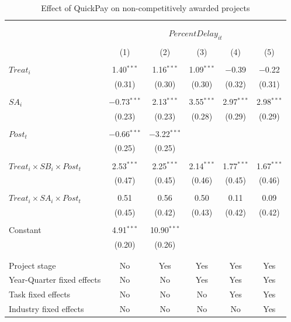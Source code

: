 \documentclass[
]{article}
\begin{document}
\begin{table}[H] \centering 
  \caption{Effect of QuickPay on non-competitively awarded projects} 
  \label{} 
\small 
\begin{tabular}{@{\extracolsep{-2pt}}lccccc} 
\\[-1.8ex]\hline 
\hline \\[-1.8ex] 
\\[-1.8ex] & \multicolumn{5}{c}{$PercentDelay_{it}$  } \\ 
\\[-1.8ex] & (1) & (2) & (3) & (4) & (5)\\ 
\hline \\[-1.8ex] 
 $Treat_i$ & 1.40$^{***}$ & 1.16$^{***}$ & 1.09$^{***}$ & $-$0.39 & $-$0.22 \\ 
  & (0.31) & (0.30) & (0.30) & (0.32) & (0.31) \\ 
  & & & & & \\ 
 $SA_i$ & $-$0.73$^{***}$ & 2.13$^{***}$ & 3.55$^{***}$ & 2.97$^{***}$ & 2.98$^{***}$ \\ 
  & (0.23) & (0.23) & (0.28) & (0.29) & (0.29) \\ 
  & & & & & \\ 
 $Post_t$ & $-$0.66$^{***}$ & $-$3.22$^{***}$ &  &  &  \\ 
  & (0.25) & (0.25) &  &  &  \\ 
  & & & & & \\ 
 $Treat_i \times SB_i \times Post_t$ & 2.53$^{***}$ & 2.25$^{***}$ & 2.14$^{***}$ & 1.77$^{***}$ & 1.67$^{***}$ \\ 
  & (0.47) & (0.45) & (0.46) & (0.45) & (0.46) \\ 
  & & & & & \\ 
 $Treat_i \times SA_i \times Post_t$ & 0.51 & 0.56 & 0.50 & 0.11 & 0.09 \\ 
  & (0.45) & (0.42) & (0.43) & (0.42) & (0.42) \\ 
  & & & & & \\ 
 Constant & 4.91$^{***}$ & 10.90$^{***}$ &  &  &  \\ 
  & (0.20) & (0.26) &  &  &  \\ 
  & & & & & \\ 
\hline \\[-1.8ex] 
Project stage & No & Yes & Yes & Yes & Yes \\ 
Year-Quarter fixed effects & No & No & Yes & Yes & Yes \\ 
Task fixed effects & No & No & No & Yes & Yes \\ 
Industry fixed effects & No & No & No & No & Yes \\ 

\end{tabular}
\end{table}
\end{document}
